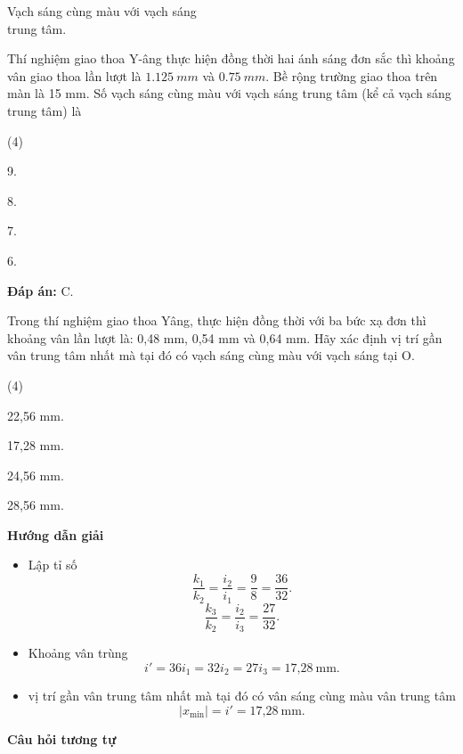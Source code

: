\begin{dang}{Vạch sáng cùng màu với vạch sáng\\ trung tâm.}
{		Thí nghiệm giao thoa Y-âng thực hiện đồng thời hai ánh sáng đơn sắc thì khoảng vân giao thoa lần lượt là $ \SI{1,125}{mm} $ và $ \SI{0,75}{mm} $. Bề rộng trường giao thoa trên màn là 15 mm. Số vạch sáng cùng màu với vạch sáng trung tâm (kể cả vạch sáng trung tâm) là
		\begin{mcq}(4)
			\item 9.			
			\item 8.				
			\item 7.				
			\item 6.
		\end{mcq}
		
		\textbf{Đáp án:} C.
	}
	{Trong thí nghiệm giao thoa Yâng, thực hiện đồng thời với ba bức xạ đơn thì khoảng vân lần lượt là: 0,48 mm, 0,54 mm và 0,64 mm. Hãy xác định vị trí gần vân trung tâm nhất mà tại đó có vạch sáng cùng màu với vạch sáng tại O.
		
		\begin{mcq}(4)
			\item 22,56 mm. 		
			\item 17,28 mm. 		
			\item 24,56 mm.  		
			\item 28,56 mm. 
		\end{mcq}
	}
	{\begin{center}
			\textbf{Hướng dẫn giải}
		\end{center}
		\begin{itemize}
			\item Lập tỉ số
			\begin{equation*}
				\dfrac{k_1}{k_2}=\dfrac{i_2}{i_1}=\dfrac{9}{8}=\dfrac{36}{32}.
			\end{equation*}
			\begin{equation*}
				\dfrac{k_3}{k_2}=\dfrac{i_2}{i_3}=\dfrac{27}{32}.
			\end{equation*}
			\item Khoảng vân trùng
			\begin{equation*}
				i'=36i_1=32i_2=27i_3= \text{17,28}\ \text{mm}.
			\end{equation*}
			\item vị trí gần vân trung tâm nhất mà tại đó có vân sáng cùng màu vân trung tâm
			\begin{equation*}
				|x_{\text{min}}|=i'=\text{17,28}\ \text{mm}.
			\end{equation*}
		\end{itemize}
		
		\begin{center}
			\textbf{Câu hỏi tương tự}
		\end{center}
		
}
\end{dang}
